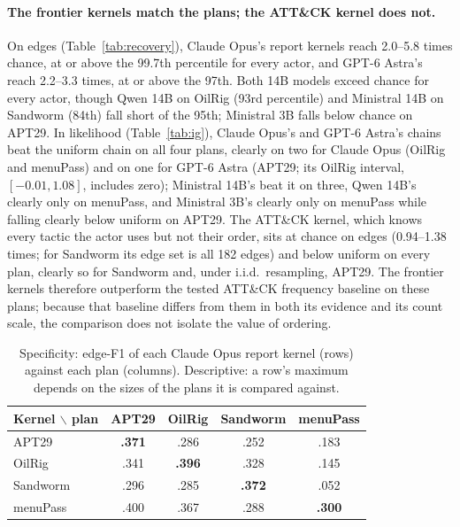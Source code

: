 \documentclass[letterpaper]{article}
\begin{document}


\paragraph{The frontier kernels match the plans; the ATT\&CK kernel does not.} On edges (Table~\ref{tab:recovery}), Claude Opus's report kernels reach 2.0--5.8 times chance, at or above the 99.7th percentile for every actor, and GPT-6 Astra's reach 2.2--3.3 times, at or above the 97th. Both 14B models exceed chance for every actor, though Qwen 14B on OilRig (93rd percentile) and Ministral 14B on Sandworm (84th) fall short of the 95th; Ministral 3B falls below chance on APT29. In likelihood (Table~\ref{tab:ig}), Claude Opus's and GPT-6 Astra's chains beat the uniform chain on all four plans, clearly on two for Claude Opus (OilRig and menuPass) and on one for GPT-6 Astra (APT29; its OilRig interval, $[-0.01, 1.08]$, includes zero); Ministral 14B's beat it on three, Qwen 14B's clearly only on menuPass, and Ministral 3B's clearly only on menuPass while falling clearly below uniform on APT29. The ATT\&CK kernel, which knows every tactic the actor uses but not their order, sits at chance on edges (0.94--1.38 times; for Sandworm its edge set is all 182 edges) and below uniform on every plan, clearly so for Sandworm and, under i.i.d.\ resampling, APT29. The frontier kernels therefore outperform the tested ATT\&CK frequency baseline on these plans; because that baseline differs from them in both its evidence and its count scale, the comparison does not isolate the value of ordering.

\begin{table}[t]
\centering
\small
\begin{tabular}{@{}lcccc@{}}
\toprule
Kernel $\backslash$ plan & APT29 & OilRig & Sandworm & menuPass \\
\midrule
APT29 & \textbf{.371} & .286 & .252 & .183 \\
OilRig & .341 & \textbf{.396} & .328 & .145 \\
Sandworm & .296 & .285 & \textbf{.372} & .052 \\
menuPass & .400 & .367 & .288 & \textbf{.300} \\
\bottomrule
\end{tabular}
\caption{Specificity: edge-F1 of each Claude Opus report kernel (rows) against each plan (columns). Descriptive: a row's maximum depends on the sizes of the plans it is compared against.}
\label{tab:h4}
\end{table}
\end{document}
